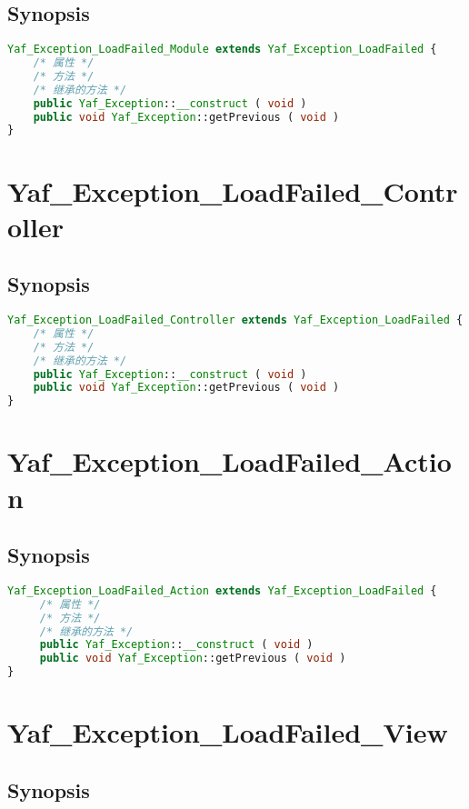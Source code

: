 \section{Synopsis}


\begin{lstlisting}[language=PHP]
Yaf_Exception_LoadFailed_Module extends Yaf_Exception_LoadFailed {
    /* 属性 */
    /* 方法 */
    /* 继承的方法 */
    public Yaf_Exception::__construct ( void )
    public void Yaf_Exception::getPrevious ( void )
}
\end{lstlisting}

\chapter{Yaf\_Exception\_LoadFailed\_Controller}


\section{Synopsis}


\begin{lstlisting}[language=PHP]
Yaf_Exception_LoadFailed_Controller extends Yaf_Exception_LoadFailed {
    /* 属性 */
    /* 方法 */
    /* 继承的方法 */
    public Yaf_Exception::__construct ( void )
    public void Yaf_Exception::getPrevious ( void )
}
\end{lstlisting}

\chapter{Yaf\_Exception\_LoadFailed\_Action}

\section{Synopsis}

\begin{lstlisting}[language=PHP]
Yaf_Exception_LoadFailed_Action extends Yaf_Exception_LoadFailed {
     /* 属性 */
     /* 方法 */
     /* 继承的方法 */
     public Yaf_Exception::__construct ( void )
     public void Yaf_Exception::getPrevious ( void )
}
\end{lstlisting}

\chapter{Yaf\_Exception\_LoadFailed\_View}


\section{Synopsis}


